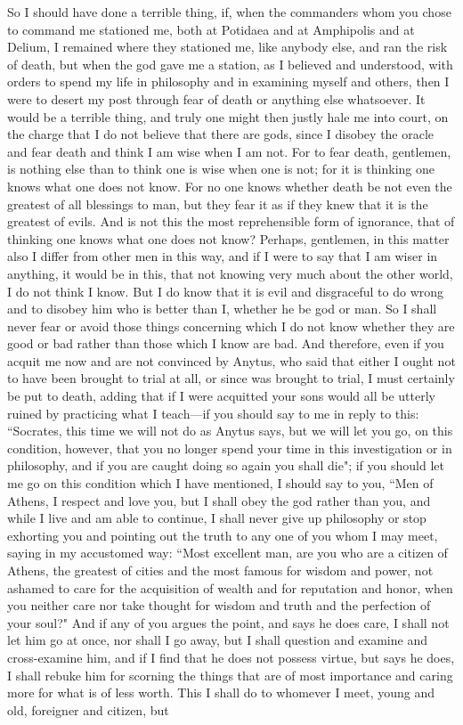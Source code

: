 \documentclass[letterpaper,12pt]{article}
\newcommand{\stephpag}[1]{\marginnote{\small\itshape\fontfamily{ppl}\selectfont #1}}
\begin{document}
So I should have done a terrible thing, \stephpag{e} if, when the commanders whom you chose to command me stationed me, both at Potidaea and at Amphipolis and at Delium, I remained where they stationed me, like anybody else, and ran the risk of death, but when the god gave me a station, as I believed and understood, with orders to spend my life in philosophy and in examining myself and others, \stephpag{29 a} then I were to desert my post through fear of death or anything else whatsoever. It would be a terrible thing, and truly one might then justly hale me into court, on the charge that I do not believe that there are gods, since I disobey the oracle and fear death and think I am wise when I am not. For to fear death, gentlemen, is nothing else than to think one is wise when one is not; for it is thinking one knows what one does not know. For no one knows whether death be not even the greatest of all blessings to man, but they fear it as if they knew that it is the greatest of evils. \stephpag{b} And is not this the most reprehensible form of ignorance, that of thinking one knows what one does not know? Perhaps, gentlemen, in this matter also I differ from other men in this way, and if I were to say that I am wiser in anything, it would be in this, that not knowing very much about the other world, I do not think I know. But I do know that it is evil and disgraceful to do wrong and to disobey him who is better than I, whether he be god or man. So I shall never fear or avoid those things concerning which I do not know whether they are good or bad rather than those which I know are bad. And therefore, even if \stephpag{c} you acquit me now and are not convinced by Anytus, who said that either I ought not to have been brought to trial at all, or since was brought to trial, I must certainly be put to death, adding that if I were acquitted your sons would all be utterly ruined by practicing what I teach---if you should say to me in reply to this: ``Socrates, this time we will not do as Anytus says, but we will let you go, on this condition, however, that you no longer spend your time in this investigation or in philosophy, and if you are caught doing so again you shall die"; \stephpag{d} if you should let me go on this condition which I have mentioned, I should say to you, ``Men of Athens, I respect and love you, but I shall obey the god rather than you, and while I live and am able to continue, I shall never give up philosophy or stop exhorting you and pointing out the truth to any one of you whom I may meet, saying in my accustomed way: ``Most excellent man, are you who are a citizen of Athens, the greatest of cities and the most famous for wisdom and power, not ashamed to care for the acquisition of wealth \stephpag{e} and for reputation and honor, when you neither care nor take thought for wisdom and truth and the perfection of your soul?" And if any of you argues the point, and says he does care, I shall not let him go at once, nor shall I go away, but I shall question and examine and cross-examine him, and if I find that he does not possess virtue, but says he does, I shall rebuke him for scorning \stephpag{30 a} the things that are of most importance and caring more for what is of less worth. This I shall do to whomever I meet, young and old, foreigner and citizen, but 
\end{document}
